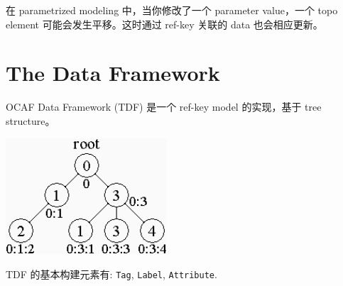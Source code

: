 \documentclass[11pt]{article}
\begin{document}
在 parametrized modeling 中，当你修改了一个 parameter value，一个 topo element 可能会发生平移。这时通过 ref-key 关联的 data 也会相应更新。
\section{The Data Framework}
\label{sec:org3d2e256}

OCAF Data Framework (TDF) 是一个 ref-key model 的实现，基于 tree structure。

\begin{center}
\includegraphics[width=6cm]{./img/ocaf_TDF_model_tree.png}
\end{center}

TDF 的基本构建元素有: \texttt{Tag}, \texttt{Label}, \texttt{Attribute}.
\end{document}
